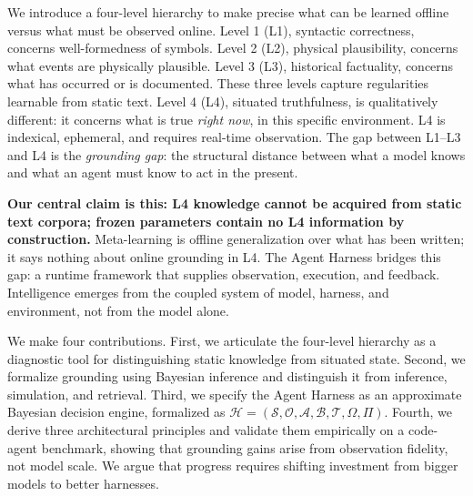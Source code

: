 We introduce a four-level hierarchy to make precise what can be learned offline versus what must be observed online. Level 1 (L1), syntactic correctness, concerns well-formedness of symbols. Level 2 (L2), physical plausibility, concerns what events are physically plausible. Level 3 (L3), historical factuality, concerns what has occurred or is documented. These three levels capture regularities learnable from static text. Level 4 (L4), situated truthfulness, is qualitatively different: it concerns what is true \emph{right now}, in this specific environment. L4 is indexical, ephemeral, and requires real-time observation. The gap between L1--L3 and L4 is the \emph{grounding gap}: the structural distance between what a model knows and what an agent must know to act in the present.

\textbf{Our central claim is this: L4 knowledge cannot be acquired from static text corpora; frozen parameters contain no L4 information by construction.} Meta-learning is offline generalization over what has been written; it says nothing about online grounding in L4. The Agent Harness bridges this gap: a runtime framework that supplies observation, execution, and feedback. Intelligence emerges from the coupled system of model, harness, and environment, not from the model alone.

We make four contributions. First, we articulate the four-level hierarchy as a diagnostic tool for distinguishing static knowledge from situated state. Second, we formalize grounding using Bayesian inference and distinguish it from inference, simulation, and retrieval. Third, we specify the Agent Harness as an approximate Bayesian decision engine, formalized as \(\mathcal{H} = (\mathcal{S}, \mathcal{O}, \mathcal{A}, \mathcal{B}, \mathcal{T}, \Omega, \Pi)\). Fourth, we derive three architectural principles and validate them empirically on a code-agent benchmark, showing that grounding gains arise from observation fidelity, not model scale. We argue that progress requires shifting investment from bigger models to better harnesses.
